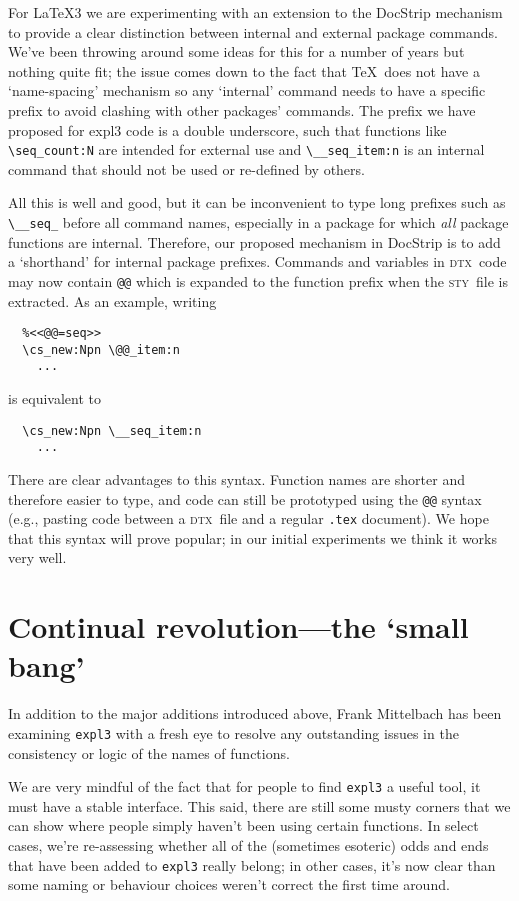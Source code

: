\documentclass{ltnews}
\def\DTX{\textsc{dtx}}
\def\STY{\textsc{sty}}
\begin{document}
For \LaTeX3 we are experimenting with an extension to the \textsf{DocStrip} mechanism to provide a clear distinction between internal and external package commands.
We've been throwing around some ideas for this for a number of years but nothing quite fit; the issue comes down to the fact that \TeX\ does not have a `name-spacing' mechanism so any `internal' command needs to have a specific prefix to avoid clashing with other packages' commands.
The prefix we have proposed for \textsf{expl3} code is a double underscore, such that functions like \verb|\seq_count:N| are intended for external use and \verb|\__seq_item:n| is an internal command that should not be used or re-defined by others.

All this is well and good, but it can be inconvenient to type long prefixes such as \verb|\__seq_| before all command names, especially in a package for which \emph{all} package functions are internal.
Therefore, our proposed mechanism in \textsf{DocStrip} is to add a `shorthand' for internal package prefixes.
Commands and variables in \DTX\ code may now contain \texttt{@@} which is expanded to the function prefix when the \STY\ file is extracted.
As an example, writing
\begin{verbatim}
  %<<@@=seq>>
  \cs_new:Npn \@@_item:n
    ...
\end{verbatim}
is equivalent to
\begin{verbatim}
  \cs_new:Npn \__seq_item:n
    ...
\end{verbatim}
There are clear advantages to this syntax.
Function names are shorter and therefore easier to type, and code can still be prototyped using the \texttt{@@} syntax
(e.g., pasting code between a \DTX\ file and a regular \texttt{.tex} document).
We hope that this syntax will prove popular; in our initial experiments we think it works very well.

\section{Continual revolution---the `small bang'}

In addition to the major additions introduced above, Frank Mittelbach has been examining \texttt{expl3} with a fresh eye to resolve any outstanding issues in the consistency or logic of the names of functions.

We are very mindful of the fact that for people to find \texttt{expl3} a useful tool, it must have a stable interface.
This said, there are still some musty corners that we can show where people simply haven't been using certain functions.
In select cases, we're re-assessing whether all of the (sometimes esoteric) odds and ends that have been added to \texttt{expl3} really belong; in other cases, it's now clear than some naming or behaviour choices weren't correct the first time around.
\end{document}
